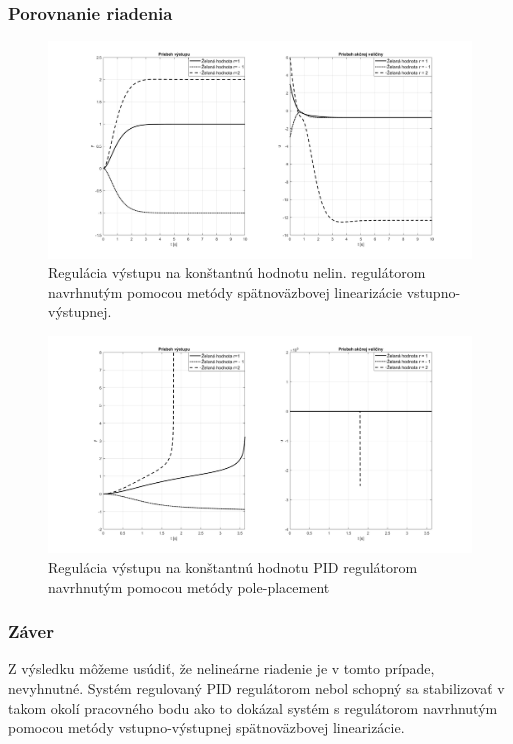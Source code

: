 \documentclass[../main.tex]{subfiles}
\begin{document}
	\subsubsection{Porovnanie riadenia}	
	\begin{figure}[h!]
		\centering
		\includegraphics[width=\linewidth]{pr2vys}
		\caption{Regulácia výstupu na konštantnú hodnotu nelin. regulátorom navrhnutým pomocou metódy spätnoväzbovej linearizácie vstupno-výstupnej.}
		\label{fig:svlvvPr2Vys}
	\end{figure}
	\begin{figure}[h!]
		\centering
		\includegraphics[width=\linewidth]{pr2vysPID}
		\caption{Regulácia výstupu na konštantnú hodnotu PID regulátorom navrhnutým pomocou metódy pole-placement}
		\label{fig:svlvvPr2VysPID}
	\end{figure}
	\newpage
	\subsubsection{Záver}
	Z výsledku môžeme usúdiť, že nelineárne riadenie je v tomto prípade, nevyhnutné. Systém regulovaný PID regulátorom nebol schopný sa stabilizovať v takom okolí pracovného bodu ako to dokázal systém s regulátorom navrhnutým pomocou metódy vstupno-výstupnej spätnoväzbovej linearizácie. 
\end{document}
